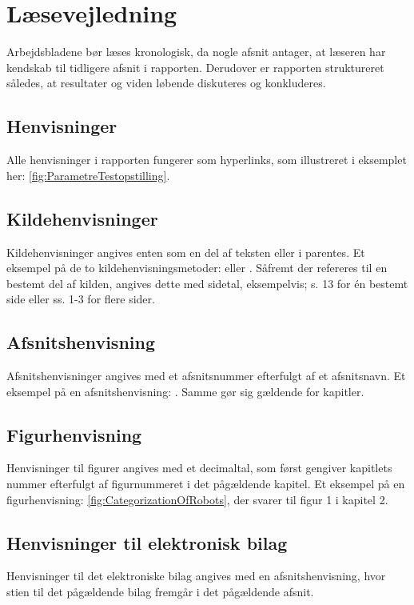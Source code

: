 \section*{Læsevejledning}
\label{Laesevejledning}
Arbejdsbladene bør læses kronologisk, da nogle afsnit antager, at læseren har kendskab til tidligere afsnit i rapporten. Derudover er rapporten struktureret således, at resultater og viden løbende diskuteres og konkluderes.

\subsection*{Henvisninger}
Alle henvisninger i rapporten fungerer som hyperlinks, som illustreret i eksemplet her: \autoref{fig:ParametreTestopstilling}.

\subsection*{Kildehenvisninger}
Kildehenvisninger angives enten som en del af teksten eller i parentes. Et eksempel på de to kildehenvisningsmetoder: \textcite[s. 13]{PDF:RobotShiftFromIPtoSR} eller \parencite[s. 13]{PDF:RobotShiftFromIPtoSR}. Såfremt der refereres til en bestemt del af kilden, angives dette med sidetal, eksempelvis; s. 13 for én bestemt side eller ss. 1-3 for flere sider.
%
\subsection*{Afsnitshenvisning}
Afsnitshenvisninger angives med et afsnitsnummer efterfulgt af et afsnitsnavn. Et eksempel på en afsnitshenvisning: . Samme gør sig gældende for kapitler.
%
\subsection*{Figurhenvisning}
Henvisninger til figurer angives med et decimaltal, som først gengiver kapitlets nummer efterfulgt af figurnummeret i det pågældende kapitel. Et eksempel på en figurhenvisning: \autoref{fig:CategorizationOfRobots}, der svarer til figur 1 i kapitel 2. 
%
\subsection*{Henvisninger til elektronisk bilag}
Henvisninger til det elektroniske bilag angives med en afsnitshenvisning, hvor stien til det pågældende bilag fremgår i det pågældende afsnit. 



